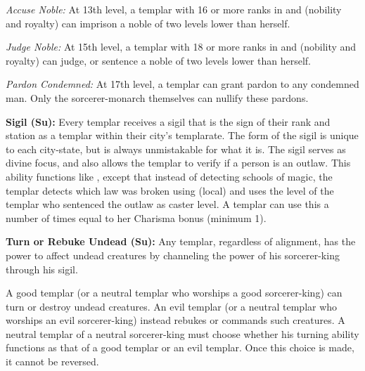 \textit{Accuse Noble:} At 13th level, a templar with 16 or more ranks in  and  (nobility and royalty) can imprison a noble of two levels lower than herself.

\textit{Judge Noble:} At 15th level, a templar with 18 or more ranks in  and  (nobility and royalty) can judge, or sentence a noble of two levels lower than herself.

\textit{Pardon Condemned:} At 17th level, a templar can grant pardon to any condemned man. Only the sorcerer-monarch themselves can nullify these pardons.


\textbf{Sigil (Su):} Every templar receives a sigil that is the sign of their rank and station as a templar within their city's templarate. The form of the sigil is unique to each city-state, but is always unmistakable for what it is. The sigil serves as divine focus, and also allows the templar to verify if a person is an outlaw. This ability functions like , except that instead of detecting schools of magic, the templar detects which law was broken using  (local) and uses the level of the templar who sentenced the outlaw as caster level. A templar can use this a number of times equal to her Charisma bonus (minimum 1).

\textbf{Turn or Rebuke Undead (Su):} Any templar, regardless of alignment, has the power to affect undead creatures by channeling the power of his sorcerer-king through his sigil.

A good templar (or a neutral templar who worships a good sorcerer-king) can turn or destroy undead creatures. An evil templar (or a neutral templar who worships an evil sorcerer-king) instead rebukes or commands such creatures. A neutral templar of a neutral sorcerer-king must choose whether his turning ability functions as that of a good templar or an evil templar. Once this choice is made, it cannot be reversed.

